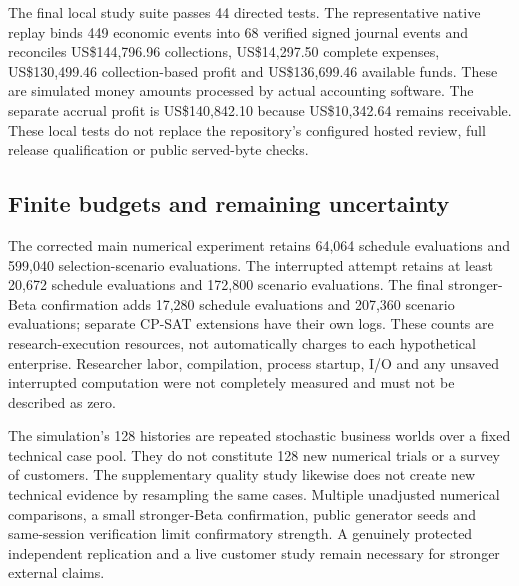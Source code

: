 \documentclass[11pt,letterpaper]{article}
\newcommand{\USD}{US\$}
\begin{document}
The final local study suite passes 44 directed tests. The representative native replay binds 449 economic events into 68 verified signed journal events and reconciles \USD144,796.96 collections, \USD14,297.50 complete expenses, \USD130,499.46 collection-based profit and \USD136,699.46 available funds. These are simulated money amounts processed by actual accounting software. The separate accrual profit is \USD140,842.10 because \USD10,342.64 remains receivable. These local tests do not replace the repository's configured hosted review, full release qualification or public served-byte checks.

\subsection{Finite budgets and remaining uncertainty}

The corrected main numerical experiment retains 64,064 schedule evaluations and 599,040 selection-scenario evaluations. The interrupted attempt retains at least 20,672 schedule evaluations and 172,800 scenario evaluations. The final stronger-Beta confirmation adds 17,280 schedule evaluations and 207,360 scenario evaluations; separate CP-SAT extensions have their own logs. These counts are research-execution resources, not automatically charges to each hypothetical enterprise. Researcher labor, compilation, process startup, I/O and any unsaved interrupted computation were not completely measured and must not be described as zero.

The simulation's 128 histories are repeated stochastic business worlds over a fixed technical case pool. They do not constitute 128 new numerical trials or a survey of customers. The supplementary quality study likewise does not create new technical evidence by resampling the same cases. Multiple unadjusted numerical comparisons, a small stronger-Beta confirmation, public generator seeds and same-session verification limit confirmatory strength. A genuinely protected independent replication and a live customer study remain necessary for stronger external claims.



\end{document}
